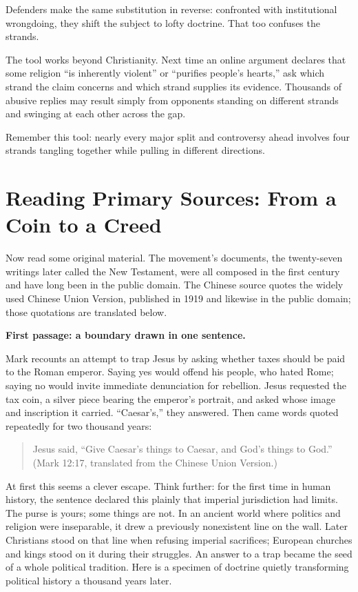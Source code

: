 Defenders make the same substitution in reverse: confronted with institutional wrongdoing, they shift the subject to lofty doctrine. That too confuses the strands.

The tool works beyond Christianity. Next time an online argument declares that some religion ``is inherently violent'' or ``purifies people's hearts,'' ask which strand the claim concerns and which strand supplies its evidence. Thousands of abusive replies may result simply from opponents standing on different strands and swinging at each other across the gap.

Remember this tool: nearly every major split and controversy ahead involves four strands tangling together while pulling in different directions.

\section[Primary Sources: Coin and Creed]{Reading Primary Sources: From a Coin to a Creed}
Now read some original material. The movement's documents, the twenty-seven writings later called the New Testament, were all composed in the first century and have long been in the public domain. The Chinese source quotes the widely used Chinese Union Version, published in 1919 and likewise in the public domain; those quotations are translated below.

\textbf{First passage: a boundary drawn in one sentence.}

Mark recounts an attempt to trap Jesus by asking whether taxes should be paid to the Roman emperor. Saying yes would offend his people, who hated Rome; saying no would invite immediate denunciation for rebellion. Jesus requested the tax coin, a silver piece bearing the emperor's portrait, and asked whose image and inscription it carried. ``Caesar's,'' they answered. Then came words quoted repeatedly for two thousand years:

\begin{quote}
Jesus said, ``Give Caesar's things to Caesar, and God's things to God.'' (Mark 12:17, translated from the Chinese Union Version.)
\end{quote}
At first this seems a clever escape. Think further: for the first time in human history, the sentence declared this plainly that imperial jurisdiction had limits. The purse is yours; some things are not. In an ancient world where politics and religion were inseparable, it drew a previously nonexistent line on the wall. Later Christians stood on that line when refusing imperial sacrifices; European churches and kings stood on it during their struggles. An answer to a trap became the seed of a whole political tradition. Here is a specimen of doctrine quietly transforming political history a thousand years later.

